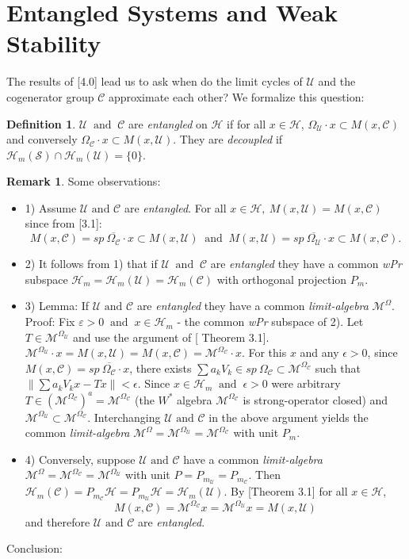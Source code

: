\documentclass[req no]{amsart}[16pt]
\theoremstyle{plain}
\theoremstyle{definition}
\newtheorem{definition}[theorem]{Definition}
\newtheorem{remark}[theorem]{Remark}
\numberwithin{equation}{section}\setcounter{page}{1}
\def\m{\mbox}
\def\ma{\m{ and }}
\def\h{\mathcal{H}}
\def\M {\mathcal{M}}
\def\C{\mathcal{C}}
\def\U{\mathcal{U}}
\begin{document}
\section{Entangled Systems and Weak Stability}
The results of [4.0] lead us to ask when do  the limit cycles of $\U$ and the cogenerator group $\C$  approximate each other? We formalize this question:

\begin{definition}$\U~\ma~\C$ are \emph{ entangled } on $\h$ if for all $x \in \h$, $\Omega_{\U}\cdot x \subset M(x, \C)$ and conversely $\Omega_{\C}\cdot x \subset M(x, \U)$. They are \emph{decoupled} if $\h_{m}(\mathcal{S})\cap \h_{m}(\mathcal{U}) = \{0\}$.
\end{definition}
\begin{remark}
Some observations:
\begin{itemize}

   \item 1) Assume $\mathcal{U} \ma \mathcal{C}$ are \emph{entangled}. For all $x \in \h, ~  M(x, \U) = M(x, \C)$ since from [3.1]:
             $$M(x, \C)= \overline{sp~\Omega_{\C}\cdot x} \subset M(x,\U)~\ma~ M(x,\U)= \overline{sp~\Omega_{\U}\cdot x} \subset M(x, \C).$$

    \item 2) It follows from 1) that if $\U ~ \ma ~\C$ are \emph{entangled} they have a common \emph{wPr} subspace $\h_{m} = \h_{m}(\U)=\h_{m}(\C)$ with orthogonal projection $P_{m}$.

    \item 3) Lemma: If $\U \ma \C$ are \emph{ entangled } they have a common \emph{limit-algebra} $\M^{\Omega}$.\\
    Proof: Fix $\varepsilon>0 ~\ma~x \in \h_{m}$ - the common \emph{wPr} subspace of 2). Let $T \in \M^{\Omega_{\U}}$ and use the argument of [ Theorem 3.1]. $\M^{\Omega_{\U}} \cdot x = M(x, \U) = M(x, \C)= \M^{\Omega_{\C}} \cdot x $. For this $x$ and any $\epsilon > 0$, since $M(x, \C)= \overline{sp~\Omega_{\C}\cdot x}$, there exists $\sum a_{k}V_{k} \in sp ~\Omega_{\C} \subset \M^{\Omega_{\C}}$ such that $\|\sum a_{k}V_{k}x - Tx\|< \epsilon$.
    Since $x \in \h_{m}~ \ma~\epsilon > 0$ were arbitrary $T \in (\M^{\Omega_{\C}})^{a} = \M^{\Omega_{\C}} $ (the $W^{*}$ algebra $\M^{\Omega_{\C}}$ is strong-operator closed) and $\M^{\Omega_{\U}} \subset \M^{\Omega_{\C}} $.
       Interchanging $\U \ma \C$ in the above argument yields the common \emph{limit-algebra} $\M^{\Omega} = \M^{\Omega_{\U}}=\M^{\Omega_{\C}}$ with unit $  P_{m}$.

   \item 4) Conversely, suppose $\U \ma \C$ have a common \emph{limit-algebra} $\M^{\Omega}=\M^{\Omega_{\C}}=\M^{\Omega_{\U}}$  with unit $P =  P_{m_{\U}} = P_{m_{\C}}$. Then $\h_{m}(\C)=P_{m_{\C}}\h = P_{m_{\U}}\h = \h_{m}(\U)$. By [Theorem 3.1] for all $x\in \h$,
   $$M(x, \C)=\M^{\Omega_{\C}}x=\M^{\Omega_{\U}}x= M(x, \U)$$
   and therefore $\U \ma \C$ are \emph{entangled}.
\end{itemize}
\end{remark}
Conclusion:
\end{document}
